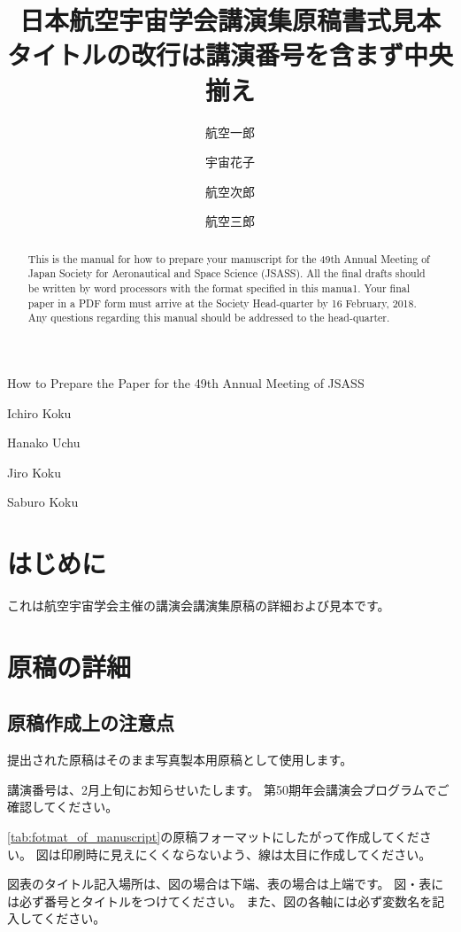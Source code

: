 \documentclass{jsass-nenkai}
\begin{document}
\title{日本航空宇宙学会講演集原稿書式見本\\タイトルの改行は講演番号を含まず中央揃え}{How to Prepare the Paper for the 49th Annual Meeting of JSASS}


\author[1]{航空一郎}{Ichiro Koku}
\author[1]{宇宙花子}{Hanako Uchu}
\author[2]{航空次郎}{Jiro Koku}
\author[1]{航空三郎}{Saburo Koku}


\begin{abstract}
  This is the manual for how to prepare your manuscript for the 49th Annual Meeting of Japan Society for Aeronautical and Space Science (JSASS).
  All the final drafts should be written by word processors with the format specified in this manua1.
  Your final paper in a PDF form must arrive at the Society Head-quarter by 16 February, 2018.
  Any questions regarding this manual should be addressed to the head-quarter.
\end{abstract}

\maketitle


\section{はじめに}
  これは航空宇宙学会主催の講演会講演集原稿の詳細および見本です。

\section{原稿の詳細}
  \subsection{原稿作成上の注意点}
    提出された原稿はそのまま写真製本用原稿として使用します。

    講演番号は、2月上旬にお知らせいたします。
    第50期年会講演会プログラムでご確認してください。

    \cref{tab:fotmat_of_manuscript}の原稿フォーマットにしたがって作成してください。
    図は印刷時に見えにくくならないよう、線は太目に作成してください。

    図表のタイトル記入場所は、図の場合は下端、表の場合は上端です。
    図・表には必ず番号とタイトルをつけてください。
    また、図の各軸には必ず変数名を記入してください。
\end{document}
